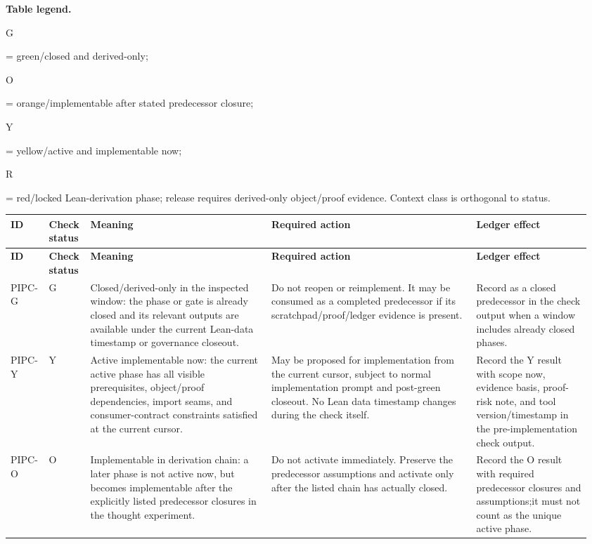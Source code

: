 \small
\par\smallskip\noindent\begin{minipage}{0.99\linewidth}\footnotesize\raggedright\textbf{Table legend.} \colorbox{green!18}{\strut G} = green/closed and derived-only; \colorbox{orange!28}{\strut O} = orange/implementable after stated predecessor closure; \colorbox{yellow!25}{\strut Y} = yellow/active and implementable now; \colorbox{red!20}{\strut R} = red/locked Lean-derivation phase; release requires derived-only object/proof evidence. Context class is orthogonal to status.\end{minipage}\par\vspace{0.25em}
\begin{longtable}{L{0.055\linewidth} L{0.065\linewidth} L{0.305\linewidth} L{0.345\linewidth} L{0.19\linewidth}}
\hline
\textbf{ID} & \textbf{Check status} & \textbf{Meaning} & \textbf{Required action} & \textbf{Ledger effect}\\
\hline
\endfirsthead
\hline
\textbf{ID} & \textbf{Check status} & \textbf{Meaning} & \textbf{Required action} & \textbf{Ledger effect}\\
\hline
\endhead
PIPC-G & G & Closed/\allowbreak{}derived-only in the inspected window: the phase or gate is already closed and its relevant outputs are available under the current Lean-data timestamp or governance closeout. & Do not reopen or reimplement. It may be consumed as a completed predecessor if its scratchpad/\allowbreak{}proof/\allowbreak{}ledger evidence is present. & Record as a closed predecessor in the check output when a window includes already closed phases.\\
\hline
\addlinespace[0.24em]
PIPC-Y & Y & Active implementable now: the current active phase has all visible prerequisites, object/\allowbreak{}proof dependencies, import seams, and consumer-contract constraints satisfied at the current cursor. & May be proposed for implementation from the current cursor, subject to normal implementation prompt and post-green closeout. No Lean data timestamp changes during the check itself. & Record the Y result with scope now, evidence basis, proof-risk note, and tool version/\allowbreak{}timestamp in the pre-implementation check output.\\
\hline
\addlinespace[0.24em]
PIPC-O & O & Implementable in derivation chain: a later phase is not active now, but becomes implementable after the explicitly listed predecessor closures in the thought experiment. & Do not activate immediately. Preserve the predecessor assumptions and activate only after the listed chain has actually closed. & Record the O result with required predecessor closures and assumptions;\newline it must not count as the unique active phase.\\

\end{longtable}
